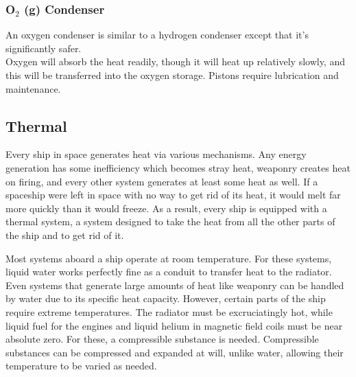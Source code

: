 \documentclass[a4paper]{article}
\begin{document}
\vspace{-0.5cm} \hspace{-18pt} \subsubsection{O$_2$ (g) Condenser} \label{engine_o2_condenser} \vspace{-0.2cm}
An oxygen condenser is similar to a hydrogen condenser except that it's significantly safer.
\\ \pbhw
{}
{}
{Oxygen will absorb the heat readily, though it will heat up relatively slowly, and this will be transferred into the oxygen storage.}
{Pistons require lubrication and maintenance.}


\subsection{Thermal} \label{thermal}

Every ship in space generates heat via various mechanisms. Any energy generation has some inefficiency which becomes stray heat, weaponry creates heat on firing, and every other system generates at least some heat as well. If a spaceship were left in space with no way to get rid of its heat, it would melt far more quickly than it would freeze. As a result, every ship is equipped with a thermal system, a system designed to take the heat from all the other parts of the ship and to get rid of it.

Most systems aboard a ship operate at room temperature. For these systems, liquid water works perfectly fine as a conduit to transfer heat to the radiator. Even systems that generate large amounts of heat like weaponry can be handled by water due to its specific heat capacity. However, certain parts of the ship require extreme temperatures. The radiator must be excruciatingly hot, while liquid fuel for the engines and liquid helium in magnetic field coils must be near absolute zero. For these, a compressible substance is needed. Compressible substances can be compressed and expanded at will, unlike water, allowing their temperature to be varied as needed.
\end{document}
